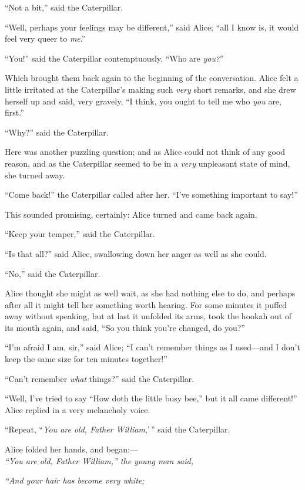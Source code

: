 \documentclass[book, 20pt]{extbook}
\begin{document}
``Not a bit,'' said the Caterpillar.

``Well, perhaps your feelings may be different,'' said Alice; ``all I
know is, it would feel very queer to \emph{me}.''

``You!'' said the Caterpillar contemptuously. ``Who are \emph{you?}''

Which brought them back again to the beginning of the conversation.
Alice felt a little irritated at the Caterpillar's making such
\emph{very} short remarks, and she drew herself up and said, very
gravely, ``I think, you ought to tell me who \emph{you} are, first.''

``Why?'' said the Caterpillar.

Here was another puzzling question; and as Alice could not think of any
good reason, and as the Caterpillar seemed to be in a \emph{very}
unpleasant state of mind, she turned away.

``Come back!'' the Caterpillar called after her. ``I've something
important to say!''

This sounded promising, certainly: Alice turned and came back again.

``Keep your temper,'' said the Caterpillar.

``Is that all?'' said Alice, swallowing down her anger as well as she
could.

``No,'' said the Caterpillar.

Alice thought she might as well wait, as she had nothing else to do, and
perhaps after all it might tell her something worth hearing. For some
minutes it puffed away without speaking, but at last it unfolded its
arms, took the hookah out of its mouth again, and said, ``So you think
you're changed, do you?''

``I'm afraid I am, sir,'' said Alice; ``I can't remember things as I
used---and I don't keep the same size for ten minutes together!''

``Can't remember \emph{what} things?'' said the Caterpillar.

``Well, I've tried to say ``How doth the little busy bee,'' but it all
came different!'' Alice replied in a very melancholy voice.

``Repeat, ``\emph{You are old, Father William},'\,'' said the
Caterpillar.

Alice folded her hands, and began:---\\
\bigskip
\noindent\emph{``You are old, Father William,'' the young man said,}

\emph{``And your hair has become very white;\\}
\end{document}
